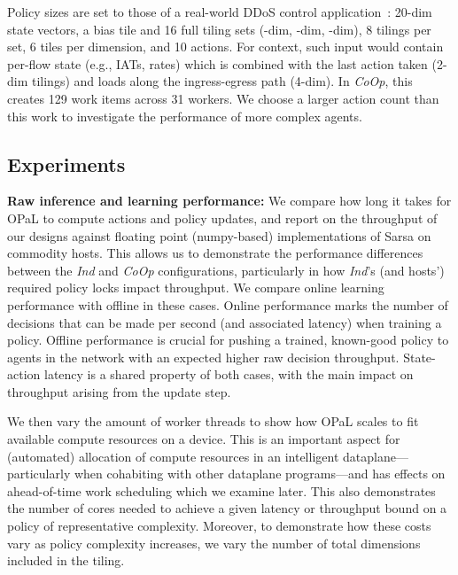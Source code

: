 \documentclass[
conference
,10pt
]{IEEEtran}
\newcommand{\fakepara}[1]{\noindent\textbf{#1:}}
\newcommand{\approachshort}{OPaL}
\newcommand{\Coopfw}{\emph{CoOp}}
\newcommand{\coopfw}{\Coopfw}
\newcommand{\Indfw}{\emph{Ind}}
\newcommand{\indfw}{\Indfw}
\begin{document}
Policy sizes are set to those of a real-world DDoS control application~\parencite{DBLP:journals/tnsm/SimpsonRP20}: 20-dim state vectors, a bias tile and 16 full tiling sets (-dim, -dim, -dim), 8 tilings per set, 6 tiles per dimension, and 10 actions.
For context, such input would contain per-flow state (e.g., IATs, rates) which is combined with the last action taken (2-dim tilings) and loads along the ingress-egress path (4-dim).
In \Coopfw{}, this creates \num{129} work items across \num{31} workers.
We choose a larger action count than this work to investigate the performance of more complex agents.

\subsection{Experiments}

\fakepara{Raw inference and learning performance}
We compare how long it takes for \approachshort{} to compute actions and policy updates, and report on the throughput of our designs against floating point (numpy-based) implementations of Sarsa on commodity hosts.
This allows us to demonstrate the performance differences between the \indfw{} and \coopfw{} configurations, particularly in how \indfw's (and hosts') required policy locks impact throughput.
We compare online learning performance with offline in these cases.
Online performance marks the number of decisions that can be made per second (and associated latency) when training a policy.
Offline performance is crucial for pushing a trained, known-good policy to agents in the network with an expected higher raw decision throughput.
State-action latency is a shared property of both cases, with the main impact on throughput arising from the update step.

We then vary the amount of worker threads to show how \approachshort{} scales to fit available compute resources on a device.
This is an important aspect for (automated) allocation of compute resources in an intelligent dataplane---particularly when cohabiting with other dataplane programs---and has effects on ahead-of-time work scheduling which we examine later.
This also demonstrates the number of cores needed to achieve a given latency or throughput bound on a policy of representative complexity.
Moreover, to demonstrate how these costs vary as policy complexity increases, we vary the number of total dimensions included in the tiling.
\end{document}
